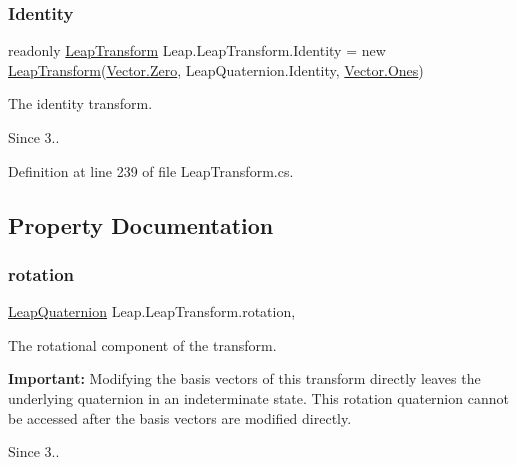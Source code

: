 \subsubsection{\texorpdfstring{Identity}{Identity}}
{\footnotesize\ttfamily readonly \mbox{\hyperlink{struct_leap_1_1_leap_transform}{Leap\+Transform}} Leap.\+Leap\+Transform.\+Identity = new \mbox{\hyperlink{struct_leap_1_1_leap_transform}{Leap\+Transform}}(\mbox{\hyperlink{struct_leap_1_1_vector_a007c4ee68aa890118b7a2d24aa4d9a6b}{Vector.\+Zero}}, Leap\+Quaternion.\+Identity, \mbox{\hyperlink{struct_leap_1_1_vector_a0eb4303bb2650290ac5ca18f1e59563d}{Vector.\+Ones}})\hspace{0.3cm}{\ttfamily [static]}}



The identity transform. 

\begin{DoxySince}{Since}
3.. 
\end{DoxySince}


Definition at line 239 of file Leap\+Transform.\+cs.



\subsection{Property Documentation}
\mbox{\label{struct_leap_1_1_leap_transform_a69917840386ec2421d3886be4ec7833a}} 
\subsubsection{\texorpdfstring{rotation}{rotation}}
{\footnotesize\ttfamily \mbox{\hyperlink{struct_leap_1_1_leap_quaternion}{Leap\+Quaternion}} Leap.\+Leap\+Transform.\+rotation\hspace{0.3cm}{\ttfamily [get]}, {\ttfamily [set]}}



The rotational component of the transform. 

{\bfseries{Important\+:}} Modifying the basis vectors of this transform directly leaves the underlying quaternion in an indeterminate state. This rotation quaternion cannot be accessed after the basis vectors are modified directly.

\begin{DoxySince}{Since}
3.. 
\end{DoxySince}



